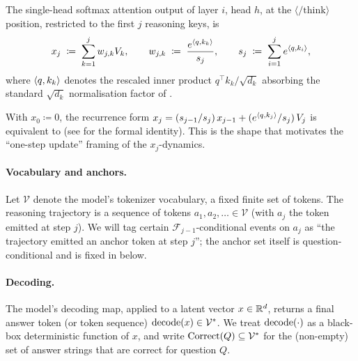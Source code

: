 \begin{definition}\label{def:softmax_attention}
The single-head softmax attention output of layer $i$, head $h$, at the
$\langle/\mathrm{think}\rangle$ position, restricted to the first $j$
reasoning keys, is
\begin{align}\label{eq:cumulative_softmax}
x_j \;\coloneqq\; \sum_{k=1}^{j} w_{j,k} V_k,
\qquad
w_{j,k} \;\coloneqq\; \frac{e^{\left\langle q, k_k \right\rangle}}{s_j},
\qquad
s_j \;\coloneqq\; \sum_{i=1}^{j} e^{\left\langle q, k_i \right\rangle},
\end{align}
where $\left\langle q, k_k \right\rangle$ denotes the rescaled inner product $q^\top k_k / \sqrt{d_k}$
absorbing the standard $\sqrt{d_k}$ normalisation factor of
\cite{vaswani2017attention}.
\end{definition}

\begin{remark}\label{rem:notation_recurrence}
With $x_0 \coloneqq 0$, the recurrence form
$x_j = (s_{j-1}/s_j)\, x_{j-1} + (e^{\left\langle q, k_j \right\rangle}/s_j)\, V_j$
is equivalent to  (see
 for the formal identity). This is the
shape that motivates the ``one-step update'' framing of the
$x_j$-dynamics.
\end{remark}

\paragraph{Vocabulary and anchors.}
Let $\mathcal V$ denote the model's tokenizer vocabulary, a fixed finite
set of tokens. The reasoning trajectory is a sequence of tokens
$a_1, a_2, \ldots \in \mathcal V$ (with $a_j$ the token emitted at step
$j$). We will tag certain $\mathcal F_{j-1}$-conditional events on
$a_j$ as ``the trajectory emitted an anchor token at step $j$''; the
anchor set itself is question-conditional and is fixed in
 below.

\paragraph{Decoding.}
The model's decoding map, applied to a latent vector
$x \in \mathbb{R}^d$, returns a final answer token (or token sequence)
$\operatorname{decode}(x) \in \mathcal V^*$. We treat $\operatorname{decode}(\cdot)$ as a black-box
deterministic function of $x$, and write $\operatorname{Correct}(Q) \subseteq \mathcal V^*$
for the (non-empty) set of answer strings that are correct for question $Q$.
